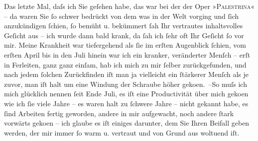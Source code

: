 \pstart
           Das letzte Mal, daſs ich Sie geſehen habe, das war bei der \label{K_L02326-1v}\label{K_L02326-1} der Oper »\textsc{Palestrina}« – da waren Sie{ }ſo schwer bedrückt von dem was in der Welt vorging und{ }ſich
               anzukündigen{ }ſchien,{ }ſo bemüht u. bekümmert{ }ſah Ihr vertrautes inhaltsvolles Geſicht
               aus – ich wurde dann bald krank, da{ }ſah ich{ }ſehr oft Ihr Geſicht{ }ſo vor mir. Meine
               Krankheit war tiefergehend als{ }ſie im erſten Augenblick{ }ſchien, vom erſten
                  April bis in den Juli hinein war ich ein kranker, veränderter
               Menſch – erſt in Ferleiten, ganz ganz einſam,
               hab ich mich zu mir{ }ſelber {\pb}zurückgefunden, und nach jedem{ }ſolchen Zurückfinden iſt man ja vielleicht ein{ }ſtärkerer Menſch als je zuvor, man iſt halt um eine Windung der Schraube höher geko{\geminationm}en. –\hspace*{1.5em}So muſs ich mich
               glücklich nennen{ }ſeit Ende Juli, es iſt eine Productivität über mich
                  geko{\geminationm}en wie ich{ }ſie viele Jahre – es waren halt zu{ }ſchwere Jahre – nicht gekannt habe, es{ }ſind Arbeiten fertig geworden, andere in mir
               aufgewacht, noch andere{ }ſtark vorwärts geko{\geminationm}en – ich
               glaube es iſt einiges darunter, dem Sie Ihren Beifall geben werden, der mir immer{ }ſo
               warm u. vertraut und von Grund aus woltuend iſt.\pend
           
